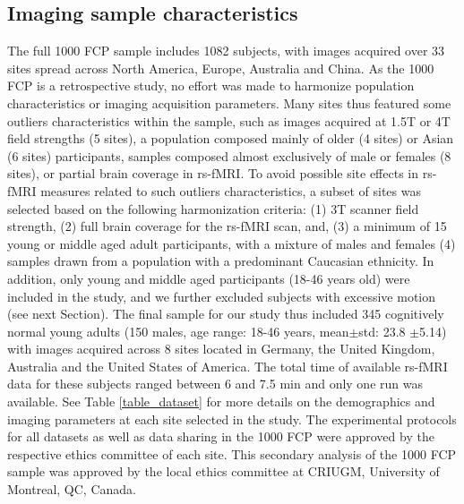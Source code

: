 \documentclass[authoryear]{elsarticle}
\begin{document}
\subsection{Imaging sample characteristics}
The full 1000 FCP sample includes 1082 subjects, with images acquired over 33 sites spread across North America, Europe, Australia and China. As the 1000 FCP is a retrospective study, no effort was made to harmonize population characteristics or imaging acquisition parameters. Many sites thus featured some outliers characteristics within the sample, such as images acquired at 1.5T or 4T field strengths (5 sites), a population composed mainly of older (4 sites) or Asian (6 sites) participants, samples composed almost exclusively of male or females (8 sites), or partial brain coverage in rs-fMRI. To avoid possible site effects in rs-fMRI measures related to such outliers characteristics, a subset of sites was selected based on the following harmonization criteria: (1) 3T scanner field strength, (2) full brain coverage for the rs-fMRI scan, and, (3) a minimum of 15 young or middle aged adult participants, with a mixture of males and females (4) samples drawn from a population with a predominant Caucasian ethnicity. In addition, only young and middle aged participants (18-46 years old) were included in the study, and we further excluded subjects with excessive motion (see next Section). The final sample for our study thus included 345 cognitively normal young adults (150 males, age range: 18-46 years, mean$\pm$std: 23.8 $\pm$5.14) with images acquired across 8 sites located in Germany, the United Kingdom, Australia and the United States of America. The total time of available rs-fMRI data for these subjects ranged between 6 and 7.5 min and only one run was available. See Table \ref{table_dataset} for more details on the demographics and imaging parameters at each site selected in the study.  The experimental protocols for all datasets as well as data sharing in the 1000 FCP were approved by the respective ethics committee of each site. This secondary analysis of the 1000 FCP sample was approved by the local ethics committee at CRIUGM, University of Montreal, QC, Canada.

 
\end{document}

